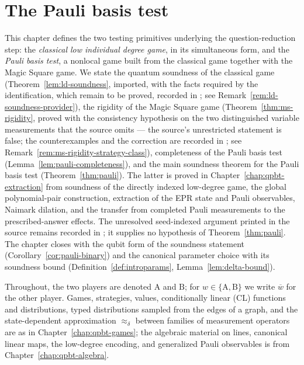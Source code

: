 \chapter{The Pauli basis test}
\label{chap:qpbt-test}
\label{sec:pauli-verifier}

This chapter defines the two testing primitives underlying the
question-reduction step: the \emph{classical low individual degree game}, in
its simultaneous form, and the \emph{Pauli basis test}, a nonlocal game built
from the classical game together with the Magic Square game. We state the
quantum soundness of the classical game (Theorem~\ref{lem:ld-soundness},
imported, with the facts required by the identification, which remain to be
proved, recorded in \cite{gap:qpbt_ld-dimension-divisibility}; see
Remark~\ref{rem:ld-soundness-provider}), the rigidity of the Magic Square game
(Theorem~\ref{thm:ms-rigidity}, proved with the consistency
hypothesis on the two distinguished variable measurements that the source
omits --- the source's unrestricted statement is false; the counterexamples
and the correction are recorded in
\cite{gap:qpbt_ms-rigidity-symmetric-strategies}; see
Remark~\ref{rem:ms-rigidity-strategy-class}), completeness of the Pauli basis
test (Lemma~\ref{lem:pauli-completeness}), and the main soundness theorem for
the Pauli basis test (Theorem~\ref{thm:pauli}). The latter is proved in
Chapter~\ref{chap:qpbt-extraction} from soundness of the directly indexed
low-degree game, the global polynomial-pair construction, extraction of the
EPR state and Pauli observables, Naimark dilation, and the transfer from
completed Pauli measurements to the prescribed-answer effects. The unresolved
seed-indexed argument printed in the source remains recorded in
\cite{gap:qpbt_ld-dimension-divisibility}; it supplies no hypothesis of
Theorem~\ref{thm:pauli}. The chapter closes with the qubit form of the soundness
statement (Corollary~\ref{cor:pauli-binary}) and the canonical parameter choice
with its soundness bound (Definition~\ref{def:introparams},
Lemma~\ref{lem:delta-bound}).

Throughout, the two players are denoted $\mathrm A$ and $\mathrm B$; for $w \in \{\mathrm A,\mathrm B\}$ we write $\overline w$ for the other player. Games, strategies, values, conditionally linear (CL) functions and distributions, typed distributions sampled from the edges of a graph, and the state-dependent approximation $\approx_\delta$ between families of measurement operators are as in Chapter~\ref{chap:qpbt-games}; the algebraic material on lines, canonical linear maps, the low-degree encoding, and generalized Pauli observables is from Chapter~\ref{chap:qpbt-algebra}.

